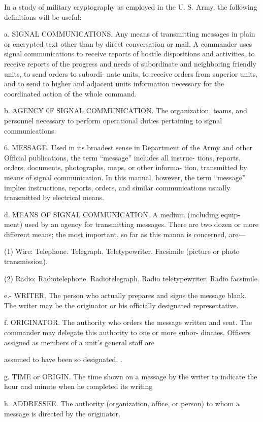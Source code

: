In a study of military cryptography as employed in the U. S. Army,
the following deﬁnitions will be useful:

a. SIGNAL COMMUNICATIONS. Any means of transmitting messages
in plain or encrypted text other than by direct conversation or mail. A
commander uses signal communications to receive reports of hostile
dispositions and activities, to receive reports of the progress and needs
of subordinate and neighboring friendly units, to send orders to subordi-
nate units, to receive orders from superior units, and to send to higher
and adjacent units information necessary for the coordinated action of
the whole command.

b. AGENCY 0F SIGNAL COMMUNICATION. The organization, teams, and
personnel necessary to perform operational duties pertaining to signal
communications.

6. MESSAGE. Used in its broadest sense in Department of the Army
and other Ofﬁcial publications, the term “message” includes all instruc-
tions, reports, orders, documents, photographs, maps, or other informa-
tion, transmitted by means of signal communication. In this manual,
however, the term “message” implies instructions, reports, orders, and
similar communications usually transmitted by electrical means.

d. MEANS OF SIGNAL COMMUNICATION. A medium (including equip-
ment) used by an agency for transmitting messages. There are two
dozen or more different means; the most important, so far as this manna
is concerned, are—

(1) Wire:
Telephone.
Telegraph.
Teletypewriter.
Facsimile (picture or photo transmission).

(2) Radio:
Radiotelephone.
Radiotelegraph.
Radio teletypewriter.
Radio facsimile.

e.- WRITER. The person who actually prepares and signs the message
blank. The writer may be the originator or his ofﬁcially designated
representative.

f. ORIGINATOR. The authority who orders the message written and
sent. The commander may delegate this authority to one or more subor-
dinates. Ofﬁcers assigned as members of a unit’s general staff are

assumed to have been so designated. .

g. TIME or ORIGIN. The time shown on a message by the writer to
indicate the hour and minute when he completed its writing

h. ADDRESSEE. The authority (organization, ofﬁce, or person) to whom
a message is directed by the originator.

